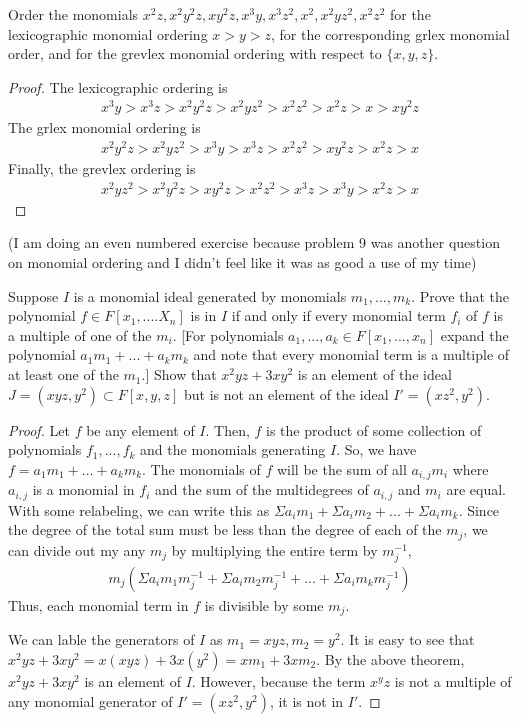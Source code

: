 \documentclass[10pt]{article}
\newenvironment{problem}[2][Problem]{\begin{trivlist}
		\item[\hskip \labelsep {\bfseries #1}\hskip \labelsep {\bfseries #2.}]}{\end{trivlist}}
\begin{document}
	\begin{problem}{6.7}
		Order the monomials $x^2z, x^2y^2z, xy^2z, x^3y, x^3z^2, x^2, x^2yz^2 , x^2z^2$ for the lexicographic monomial ordering $x > y > z$, for the corresponding grlex monomial order, and for the grevlex monomial ordering with respect to $\{x, y, z \}$.
		\begin{proof}
			The lexicographic ordering is
			\begin{align*}
				x^3y > x^3z > x^2y^2z > x^2yz^2 > x^2z^2 > x^2z > x > xy^2z
			\end{align*}
			The grlex monomial ordering is 
			\begin{align*}
				x^2y^2z > x^2yz^2 > x^3y > x^3z > x^2z^2 > xy^2z > x^2z > x
			\end{align*}
			Finally, the grevlex ordering is
			\begin{align*}
				x^2yz^2 > x^2y^2z > xy^2z > x^2z^2 > x^3z > x^3y > x^2z > x
			\end{align*}
		\end{proof}
	\end{problem}
	
	(I am doing an even numbered exercise because problem 9 was another question on monomial ordering and I didn't feel like it was as good a use of my time)
	\begin{problem}{6.10}
		Suppose $I$ is a monomial ideal generated by monomials $m_1, ..., m_k$. Prove that the polynomial $f \in F[x_1 , . . . . X_n]$ is in $I$ if and only if every monomial term $f_i$ of $f$ is a multiple of one of the $m_i$. [For polynomials $a_1 , ..., a_k \in F[x_1, ..., x_n]$ expand the polynomial $a_1 m_1 + ...+ a_km_k$ and note that every monomial term is a multiple of at least one of the $m_1$.] Show that $x^2yz+3xy^2$ is an element of the ideal $J = (xyz, y^2) \subset F[x,y,z]$ but is not an element of the ideal $I' = (xz^2, y^2)$.
		\begin{proof}
			Let $f$ be any element of $I$. Then, $f$ is the product of some collection of polynomials $f_1, ..., f_k$ and the monomials generating $I$. So, we have $f = a_1m_1 + ... + a_km_k$. The monomials of $f$ will be the sum of all $a_{i,j}m_i$ where $a_{i,j}$ is a monomial in $f_i$ and the sum of the multidegrees of $a_{i,j}$ and $m_i$ are equal. With some relabeling, we can write this as $\Sigma a_im_1 + \Sigma a_im_2 + ... + \Sigma a_im_k$. Since the degree of the total sum must be less than the degree of each of the $m_j$, we can divide out my any $m_j$ by multiplying the entire term by $m_j^{-1}$,
			\begin{align*}
				m_j(\Sigma a_im_1m_j^{-1} + \Sigma a_im_2m_j^{-1} + ... + \Sigma a_im_km_j^{-1})
			\end{align*}
			Thus, each monomial term in $f$ is divisible by some $m_j$.
			
			We can lable the generators of $I$ as $m_1 = xyz, m_2=y^2$. It is easy to see that $x^2yz + 3xy^2 = x(xyz) + 3x(y^2) = xm_1 + 3xm_2$. By the above theorem, $x^2yz + 3xy^2$ is an element of $I$. However, because the term $x^yz$ is not a multiple of any monomial generator of $I'=(xz^2, y^2)$, it is not in $I'$.
		\end{proof}
	\end{problem}
\end{document}
